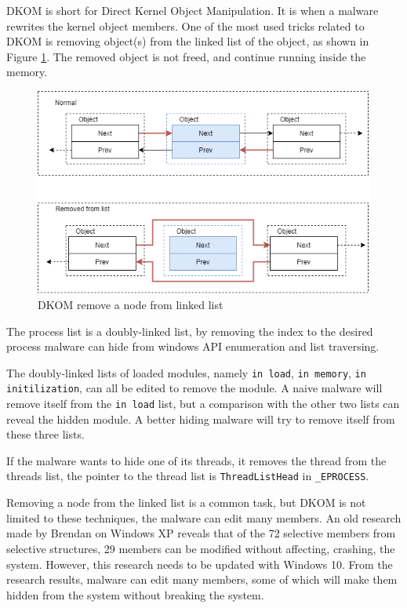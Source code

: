 DKOM is short for Direct Kernel Object Manipulation. It is when a malware
rewrites the kernel object members. One of the most used tricks related to DKOM
is removing object(s) from the linked list of the object, as shown in Figure
\ref{fig:dkom}. The removed object is not freed, and continue running inside
the memory.

\begin{figure}[h]
  \centering
  \caption{DKOM remove a node from linked list}
  \label{fig:dkom}
  \includegraphics[scale=0.7]{images/dkom.png}
\end{figure}

The process list is a doubly-linked list, by removing the index to the desired
process malware can hide from windows API enumeration and list traversing.

The doubly-linked lists of loaded modules, namely \texttt{in load}, \texttt{in
memory}, \texttt{in initilization}, can all be edited to remove the module. A
naive malware will remove itself from the \texttt{in load} list, but a
comparison with the other two lists can reveal the hidden module. A better
hiding malware will try to remove itself from these three lists.

If the malware wants to hide one of its threads, it removes the thread from the
threads list, the pointer to the thread list is \texttt{ThreadListHead} in
\texttt{\_EPROCESS}.

Removing a node from the linked list is a common task, but DKOM is not limited
to these techniques, the malware can edit many members. An old
research\cite{robussignature} made by Brendan on Windows XP reveals that of the
72 selective members from selective structures, 29 members can be modified
without affecting, crashing, the system.  However, this research needs to be
updated with Windows 10. From the research results, malware can edit many
members, some of which will make them hidden from the system without breaking
the system.
